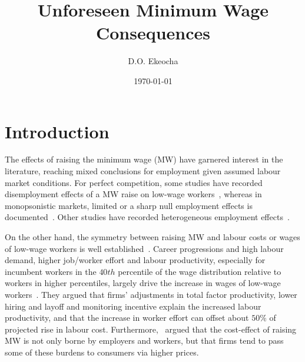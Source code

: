 \documentclass[12pt, english]{article}
\title{{Unforeseen Minimum Wage Consequences}}
\author[1]{D.O. Ekeocha}
\affil[1]{
    University of Liverpool Management School
    \\ \texttt{davidmac.ekeocha@liverpool.ac.uk}
}
\date{\today}
\begin{document}
    \maketitle


    \section{Introduction}\label{sec:introduction}
    The effects of raising the minimum wage (MW) have garnered interest in the literature, reaching mixed conclusions for employment given assumed labour market conditions. For perfect competition, some studies have recorded disemployment effects of a MW raise on low-wage workers~\parencite{stigler1946economics, hamermesh1982minimum, neumark1992employment, brown1999minimum, machin2004minimum, neumark2000minimum, borjas2010labor}, whereas in monopsonistic markets, limited or a sharp null employment effects is documented~\parencite{lester1960employment, card1993minimum, card2000minimum,aaronson2018industry, cengiz2019effect, wong2019minimum, dustmann2022reallocation}. Other studies have recorded heterogeneous employment effects~\parencite{okudaira2019minimum, medrano2023minimum, meer2023effects, gregory2022minimum}.

    On the other hand, the symmetry between raising MW and labour costs or wages of low-wage workers is well established~\parencite{medrano2023minimum,clemens2023important}. Career progressions and high labour demand, higher job/worker effort and labour productivity, especially for incumbent workers in the $40th$ percentile of the wage distribution relative to workers in higher percentiles, largely drive the increase in wages of low-wage workers~\parencite{riley2017raising, kim2019minimum, wong2019minimum, baek2021impact, zhao2021effects, seok2022macroeconomic, ku2022does, coviello2022minimum, alexandre2022minimum}. They argued that firms' adjustments in total factor productivity, lower hiring and layoff and monitoring incentive explain the increased labour productivity, and that the increase in worker effort can offset about $50\%$ of projected rise in labour cost. Furthermore,~\cite{harasztosi2019pays} argued that the cost-effect of raising MW is not only borne by employers and workers, but that firms tend to pass some of these burdens to consumers via higher prices.
\end{document}
